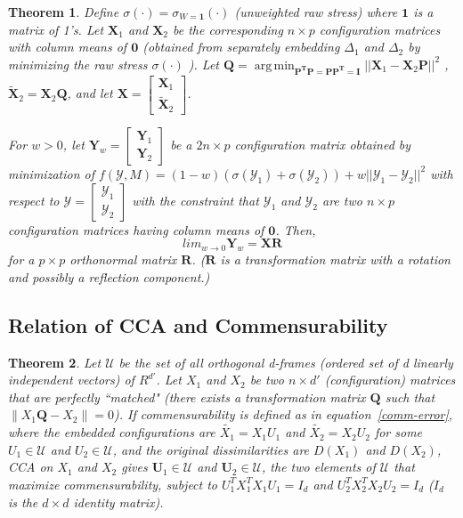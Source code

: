 \documentclass[11pt]{article} %
\DeclareMathOperator*{\argmin}{arg\,min}
\newcommand{\mcY}{\mathcal{Y}}
\newtheorem{thm}{Theorem}
\begin{document}
\begin{thm}
Define $\sigma(\cdot)=\sigma_{W=\bm{1}}(\cdot)$ (unweighted raw stress) where $\bm{1}$ is a matrix of 1's.
 Let $\mathbf{X}_1$ and $\mathbf{X}_2$ be the corresponding $n\times p$ configuration matrices with column means of $\bm{0}$ (obtained from separately embedding  $\Delta_1$ and $\Delta_2$ by minimizing the raw stress $\sigma(\cdot)$ ). 
Let  $\mathbf{Q}=\argmin_{\mathbf{P^T}\mathbf{P}=\mathbf{P}\mathbf{P^T}=\mathbf{I}}||{\mathbf{X}_1-\mathbf{X}_2}\mathbf{P}||^2$ ,   $\mathbf{\tilde{X}}_2= \mathbf{X}_2\mathbf{Q}$, 
and let  
$\mathbf{X}=\left[\begin{array}{c}
\mathbf{X}_1\\
\mathbf{\tilde{X}}_2
\end{array}\right]$.

For $w>0$, let $\mathbf{Y}_{w} = \left[\begin{array}{c}
\mathbf{Y}_1\\
\mathbf{Y}_2
\end{array}\right]$  be  a $2n \times p$ configuration matrix obtained by minimization of 
$ f(\mcY, M) =(1-w)\left({\sigma{(\mcY_1)}}+{\sigma{(\mcY_2)}}\right)+w||{\mcY_1-\mcY_2}||^2 $ with respect to  $\mcY=\left[\begin{array}{c}
\mcY_1\\
\mcY_2
\end{array}\right]$ with the constraint that $\mcY_1$ and $\mcY_2$ are two $n \times p$ configuration matrices having column means of $\bm{0}$. Then, $$lim_{w\rightarrow0}\mathbf{Y}_{w}=\mathbf{X}\mathbf{R}$$ for a $p\times p$ orthonormal matrix $\mathbf{R}$. ($\mathbf{R}$ is a transformation matrix with a rotation and possibly a reflection component.)
\end{thm}
 

\subsection{Relation of CCA and Commensurability} 

\begin{thm}
Let $ \mathcal{U}$ be the set of all orthogonal d-frames 
(ordered set of d linearly independent vectors) of $R^{d'}$. 
Let $X_1$ and $X_2$  be two $n\times d'$ (configuration) matrices that are perfectly ``matched"
 (there exists a transformation matrix $\mathbf{Q}$ such that $\|   X_1\mathbf{Q}  -X_2 \|=0$).
If commensurability is  defined as
in equation~\eqref{comm-error},
 where  the embedded configurations are $\tilde{X_1}=X_1U_1$ and $\tilde{X_2}=X_2U_2$ for some  $U_1\in \mathcal{U}$ and $U_2\in  \mathcal{U}$,
and   the original dissimilarities are $D(X_1)$ and $D(X_2) $,
 CCA on $X_1$ and $X_2$ gives $\mathbf{U}_1\in\mathcal{U}$ and  $\mathbf{U}_2\in\mathcal{U}$, 
 the two elements of $\mathcal{U}$ that maximize commensurability, subject to $U_1^{T}X_1^{T}X_1U_1=I_d$ and $U_2^{T}X_2^{T}X_2U_2=I_d$ ($I_d$ is the $d \times d$ identity matrix).
\end{thm}
\end{document}
